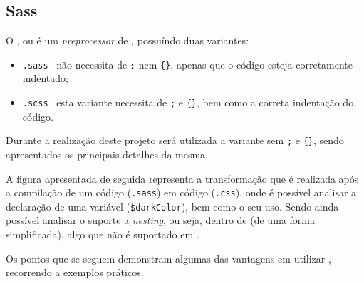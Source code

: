 \subsection{Sass}

\begin{minipage}{.3\textwidth}
\end{minipage}
\begin{minipage}{.7\textwidth}
	\minipagerestore
	O \textbf{}, ou \underline{} é um \textit{preprocessor} de \textbf{}, possuíndo duas variantes:

	\begin{itemize}
		\item \texttt{.sass} \textemdash~não necessita de \texttt{;} nem \verb|{}|, apenas que o código esteja corretamente indentado;
		\item \texttt{.scss} \textemdash~esta variante necessita de \texttt{;} e \verb|{}|, bem como a correta indentação do código.
	\end{itemize}
\end{minipage}

Durante a realização deste projeto será utilizada a variante sem \texttt{;} e \verb|{}|, sendo apresentados os principais detalhes da mesma.

A figura apresentada de seguida representa a transformação que é realizada após a compilação de um código \textbf{} (\texttt{.sass}) em código \textbf{} (\texttt{.css}), onde é possível analisar a declaração de uma variável (\verb|$darkColor|), bem como o seu uso. Sendo ainda possível analisar o suporte a \textit{nesting}, ou seja, \textbf{} dentro de \textbf{} (de uma forma simplificada), algo que não é suportado em \textbf{}.

\clearpage


Os pontos que se seguem demonstram algumas das vantagens em utilizar \textbf{}, recorrendo a exemplos práticos.





